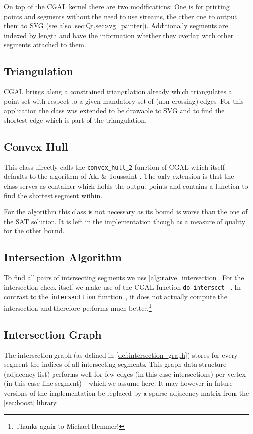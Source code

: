 On top of the CGAL kernel there are two modifications: One is for
printing points and segments without the need to use streams, the
other one to output them to SVG (see also
\cref{sec:Qt,sec:svg_painter}). Additionally segments are indexed by
length and have the information whether they overlap with other
segments attached to them.

\subsection{Triangulation}
CGAL brings along a constrained triangulation already
\cite{cgal_manual_constrained_triangulation}
which triangulates a point set with respect to a given mandatory set
of (non-crossing) edges. For this application the class was extended
to be drawable to SVG and to find the shortest edge which is part of
the triangulation.

\subsection{Convex Hull}
This class directly calls the \verb|convex_hull_2| function of CGAL
\cite{cgal_manual_convex_hull} which itself defaults to the algorithm
of Akl \& Toussaint \cite{convex_hull}. The only extension is that
the class serves as container
which holds the output points and contains a function to find the 
shortest segment within.

For the algorithm this class is not necessary as its bound is worse
than the one of the SAT solution. It is left in the implementation
though as a measure of quality for the other bound.

\subsection{Intersection Algorithm}
To find all pairs of intersecting segments we use 
\cref{alg:naive_intersection}. For the intersection check itself
we make use of the CGAL function \verb|do_intersect|%
~\cite{cgal_manual_do_intersect}. In contrast to the
\verb|intersecttion| function~\cite{cgal_manual_intersection}, it
does not actually compute the intersection and therefore performs
much better.\footnote{Thanks again to Michael Hemmer!}

\subsection{Intersection Graph}
The intersection graph (as defined in \cref{def:intersection_graph})
stores for every segment the indices of all intersecting segments.
This graph data structure (adjacency list) performs well for few
edges (in this case intersections) per vertex (in this case line
segment)---which we assume here. It may however in future versions
of the implementation be replaced by a sparse adjacency matrix from
the \cref{sec:boost} library.

